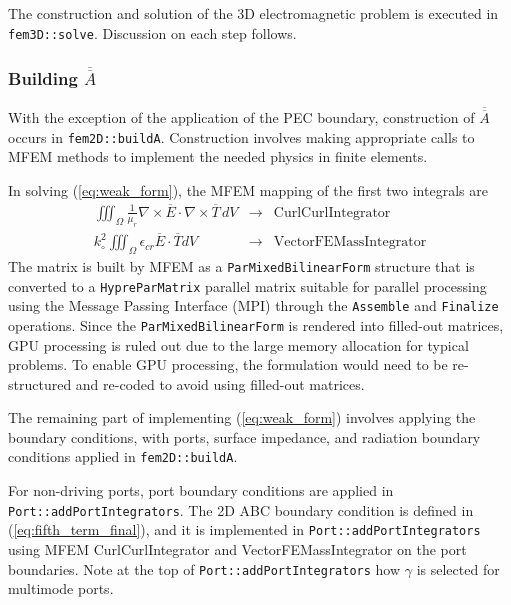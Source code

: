\documentclass[titlepage]{article}
\renewcommand\_{\textunderscore\linebreak[1]}
\begin{document}
The construction and solution of the 3D electromagnetic problem is executed in \texttt{fem3D::solve}.  Discussion on each step follows.

\subsubsection{Building $\overline{\overline{A}}$}

With the exception of the application of the PEC boundary, construction of $\overline{\overline{A}}$ occurs in \texttt{fem2D::build\_A}. Construction involves making appropriate calls to MFEM methods to implement the needed physics in finite elements.

In solving (\ref{eq:weak_form}), the MFEM mapping of the first two integrals are
\begin{equation}
\begin{array}{lcr}
\iiint_{\Omega}\frac{1}{\mu_r}\nabla\times\overline{E}\cdot\nabla\times\overline{T}\,dV & \rightarrow & \text{CurlCurlIntegrator} \\[5pt]
k_\circ^2\iiint_{\Omega}\epsilon_{cr}\overline{E}\cdot\overline{T}dV & \rightarrow  & \text{VectorFEMassIntegrator}
\end{array}
\end{equation}
The matrix is built by MFEM as a \texttt{ParMixedBilinearForm} structure that is converted to a \texttt{HypreParMatrix} parallel matrix suitable for parallel processing using the Message Passing Interface (MPI) through the \texttt{Assemble} and \texttt{Finalize} operations.  Since the \texttt{ParMixedBilinearForm} is rendered into filled-out matrices, GPU processing is ruled out due to the large memory allocation for typical problems.  To enable GPU processing, the formulation would need to be re-structured and re-coded to avoid using filled-out matrices.

The remaining part of implementing (\ref{eq:weak_form}) involves applying the boundary conditions, with ports, surface impedance, and radiation boundary conditions applied in \texttt{fem2D::build\_A}.

For non-driving ports, port boundary conditions are applied in \texttt{Port::addPortIntegrators}. The 2D ABC boundary condition is defined in (\ref{eq:fifth_term_final}), and it is implemented in \texttt{Port::addPortIntegrators} using MFEM CurlCurlIntegrator and VectorFEMassIntegrator on the port boundaries.  Note at the top of \texttt{Port::addPortIntegrators} how $\gamma$ is selected for multimode ports. 
\end{document}
